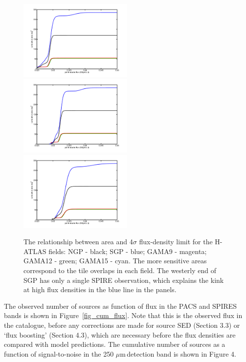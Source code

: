 \documentclass[useAMS,usenatbib]{mn2e}
\def\mic{ $\mu $m\,}
\begin{document}
\begin{figure} %
\includegraphics[width=0.5\textwidth]{flux_area_250.pdf}
\includegraphics[width=0.5\textwidth]{flux_area_350.pdf}
\includegraphics[width=0.5\textwidth]{flux_area_500.pdf}
\caption{The
relationship between area and 4$\sigma$ flux-density limit
for the
  H-ATLAS fields: NGP - black; SGP - blue; GAMA9 - magenta; GAMA12 - green;
  GAMA15 - cyan.  The more sensitive areas correspond to the
tile overlaps in each field.
The westerly end of SGP has only a single SPIRE observation,
which explains the kink at high flux densities
in the blue line in the panels.}

\label{fig_areas}
\end{figure}

The observed number of sources as  function of flux in the PACS and
SPIRES bands is shown in Figure~\ref{fig_cum_flux}. 
Note that this is the observed flux in the catalogue, before any
corrections are made for source SED (Section 3.3) or `flux boosting'
(Section 4.3), which are necessary
before the flux densities are compared with model predictions.
The cumulative number of sources as a function of signal-to-noise in
the 250\mic detection band is shown in Figure 4.
\end{document}

